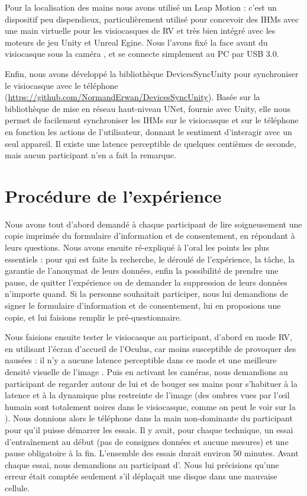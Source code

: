 Pour la localisation des mains nous avons utilisé un Leap Motion : c'est un dispositif peu dispendieux, particulièrement utilisé pour concevoir des IHMs avec une main virtuelle pour les visiocasques de RV et très bien intégré avec les moteurs de jeu Unity et Unreal Egine. Nous l'avons fixé la face avant du visiocasque sous la caméra , et se connecte simplement au PC par USB 3.0.

Enfin, nous avons développé la bibliothèque DevicesSyncUnity pour synchroniser le visiocasque avec le téléphone (\url{https://github.com/NormandErwan/DevicesSyncUnity}). Basée sur la bibliothèque de mise en réseau haut-niveau UNet, fournie avec Unity, elle nous permet de facilement synchroniser les IHMs sur le visiocasque et sur le téléphone en fonction les actions de l'utilisateur, donnant le sentiment d'interagir avec un seul appareil. Il existe une latence perceptible de quelques centièmes de seconde, mais aucun participant n'en a fait la remarque.


\section{Procédure de l'expérience}
\label{sec:experiment_procedure}

Nous avons tout d'abord demandé à chaque participant de lire soigneusement une copie imprimée du formulaire d'information et de consentement, en répondant à leurs questions. Nous avons ensuite ré-expliqué à l'oral les points les plus essentiels : pour qui est faite la recherche, le déroulé de l'expérience, la tâche, la garantie de l'anonymat de leurs données, enfin la possibilité de prendre une pause, de quitter l'expérience ou de demander la suppression de leurs données n'importe quand. Si la personne souhaitait participer, nous lui demandions de signer le formulaire d'information et de consentement, lui en proposions une copie, et lui faisions remplir le pré-questionnaire.

Nous faisions ensuite tester le visiocasque au participant, d'abord en mode RV, en utilisant l'écran d'accueil de l'Oculus, car moins susceptible de provoquer des nausées : il n'y a aucune latence perceptible dans ce mode et une meilleure densité visuelle de l'image . Puis en activant les caméras, nous demandions au participant de regarder autour de lui et de bouger ses mains pour s'habituer à la latence et à la dynamique plus restreinte de l'image (des ombres vues par l'\oe il humain sont totalement noires dans le visiocasque, comme on peut le voir sur la ). Nous donnions alors le téléphone dans la main non-dominante du participant pour qu'il puisse démarrer les essais. Il y avait, pour chaque technique, un essai d'entraînement au début (pas de consignes données et aucune mesures) et une pause obligatoire à la fin. L'ensemble des essais durait environ 50 minutes. Avant chaque essai, nous demandions au participant d'. Nous lui précisions qu'une erreur était comptée seulement s'il déplaçait une disque dans une mauvaise cellule.

